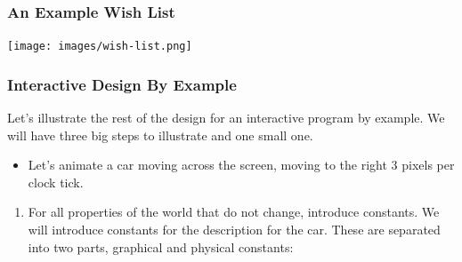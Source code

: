 \documentclass{beamer}
\begin{document}
\begin{frame}
  \frametitle{An Example Wish List}
  \begin{center}
    \texttt{[image: images/wish-list.png]}
  \end{center}
\end{frame}



\begin{frame}
  \frametitle{Interactive Design By Example}
  Let's illustrate the rest of the design for an interactive program by example.
  We will have three big steps to illustrate and one small one.
  \begin{itemize}
  \item<2-> Let's animate a car moving across the screen, moving to the right 3 pixels per clock tick. 
  \end{itemize}
  \begin{enumerate}
  \item<3-> For all properties of the world that do not change, introduce constants.
    We will introduce constants for the description for the car. These are separated into two parts, graphical and physical constants:
    \constants
  \end{enumerate}
\end{frame}
\end{document}
